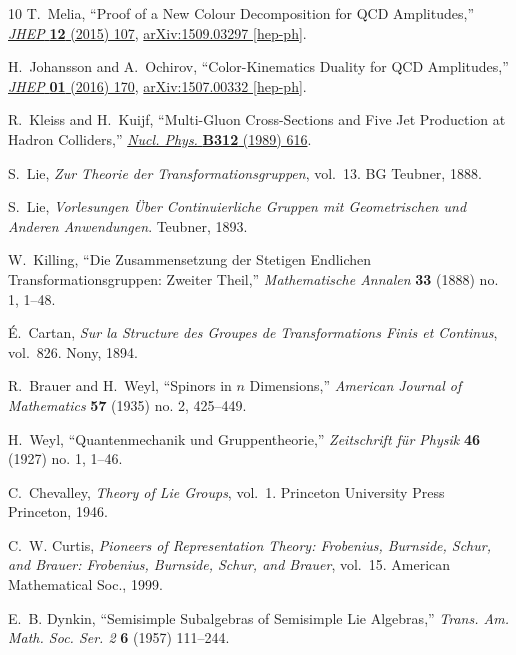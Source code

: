 \documentclass[12pt,a4paper]{article}\let\ifpdf\relax
\begin{document}
\begin{thebibliography}{10}
T.~Melia, ``{Proof of a New Colour Decomposition for QCD Amplitudes},''
  \href{http://dx.doi.org/10.1007/JHEP12(2015)107}{{\em JHEP} {\bf 12} (2015)
  107}, \href{http://arxiv.org/abs/1509.03297}{{ arXiv:1509.03297 [hep-ph]}}.

H.~Johansson and A.~Ochirov, ``{Color-Kinematics Duality for QCD Amplitudes},''
  \href{http://dx.doi.org/10.1007/JHEP01(2016)170}{{\em JHEP} {\bf 01} (2016)
  170}, \href{http://arxiv.org/abs/1507.00332}{{ arXiv:1507.00332 [hep-ph]}}.

R.~Kleiss and H.~Kuijf, ``{Multi-Gluon Cross-Sections and Five Jet Production
  at Hadron Colliders},''
\href{http://dx.doi.org/10.1016/0550-3213(89)90574-9}{{\em Nucl. Phys.} {\bf
  B312} (1989)  616}.

S.~Lie, {\em {Zur Theorie der Transformationsgruppen}}, vol.~13.
\newblock BG Teubner, 1888.

S.~Lie, {\em {Vorlesungen \"{U}ber Continuierliche Gruppen mit Geometrischen
  und Anderen Anwendungen}}.
\newblock Teubner, 1893.

W.~Killing, ``{Die Zusammensetzung der Stetigen Endlichen
  Transformationsgruppen: Zweiter Theil},'' {\em Mathematische Annalen} {\bf
  33} (1888) no. 1, 1--48.

{\'E}.~Cartan, {\em {Sur la Structure des Groupes de Transformations Finis et
  Continus}}, vol.~826.
\newblock Nony, 1894.

R.~Brauer and H.~Weyl, ``{Spinors in $n$ Dimensions},'' {\em American Journal
  of Mathematics} {\bf 57} (1935) no. 2, 425--449.

H.~Weyl, ``{Quantenmechanik und Gruppentheorie},'' {\em Zeitschrift f{\"u}r
  Physik} {\bf 46} (1927) no. 1, 1--46.

C.~Chevalley, {\em {Theory of Lie Groups}}, vol.~1.
\newblock Princeton University Press Princeton, 1946.

C.~W. Curtis, {\em {Pioneers of Representation Theory: Frobenius, Burnside,
  Schur, and Brauer: Frobenius, Burnside, Schur, and Brauer}}, vol.~15.
\newblock American Mathematical Soc., 1999.

E.~B. Dynkin, ``{Semisimple Subalgebras of Semisimple Lie Algebras},'' {\em
  Trans. Am. Math. Soc. Ser. 2} {\bf 6} (1957)  111--244.


\end{thebibliography}
\end{document}
